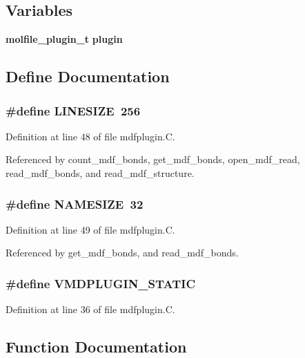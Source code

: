 \subsection*{Variables}
\begin{CompactItemize}
\item 
{\bf molfile\_\-plugin\_\-t} {\bf plugin}
\end{CompactItemize}


\subsection{Define Documentation}
\subsubsection{\setlength{\rightskip}{0pt plus 5cm}\#define LINESIZE\ 256}\label{mdfplugin_8C_a1}




Definition at line 48 of file mdfplugin.C.

Referenced by count\_\-mdf\_\-bonds, get\_\-mdf\_\-bonds, open\_\-mdf\_\-read, read\_\-mdf\_\-bonds, and read\_\-mdf\_\-structure.
\subsubsection{\setlength{\rightskip}{0pt plus 5cm}\#define NAMESIZE\ 32}\label{mdfplugin_8C_a2}




Definition at line 49 of file mdfplugin.C.

Referenced by get\_\-mdf\_\-bonds, and read\_\-mdf\_\-bonds.
\subsubsection{\setlength{\rightskip}{0pt plus 5cm}\#define VMDPLUGIN\_\-STATIC}\label{mdfplugin_8C_a0}




Definition at line 36 of file mdfplugin.C.

\subsection{Function Documentation}
